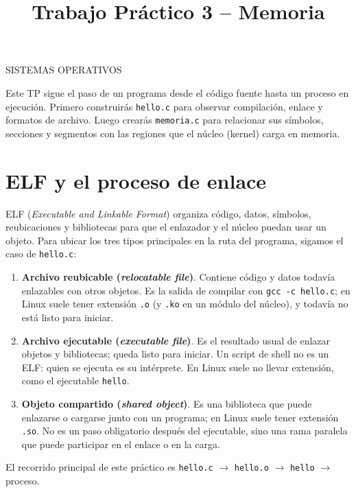 \documentclass[11pt,a4paper]{article}
\title{Trabajo Práctico 3 -- Memoria}
\author{}
\date{}
\begin{document}
\maketitle
\thispagestyle{fancy}
\begin{center}
SISTEMAS OPERATIVOS
\end{center}
\newpage

\tableofcontents
\newpage

Este TP sigue el paso de un programa desde el código fuente hasta un proceso
en ejecución. Primero construirás \texttt{hello.c} para observar compilación,
enlace y formatos de archivo. Luego crearás \texttt{memoria.c} para relacionar
sus símbolos, secciones y segmentos con las regiones que el núcleo (kernel)
carga en memoria.

\section{ELF y el proceso de enlace}

ELF (\emph{Executable and Linkable Format}) organiza código, datos, símbolos,
reubicaciones y bibliotecas para que el enlazador y el núcleo puedan usar un
objeto. Para ubicar los tres tipos principales en la ruta del programa,
sigamos el caso de \texttt{hello.c}:

\begin{enumerate}
  \item \textbf{Archivo reubicable (\emph{relocatable file})}. Contiene código
  y datos todavía enlazables con otros objetos. Es la salida de compilar con
  \texttt{gcc -c hello.c}; en Linux suele tener extensión \texttt{.o} (y
  \texttt{.ko} en un módulo del núcleo), y todavía no está listo para iniciar.
  \item \textbf{Archivo ejecutable (\emph{executable file})}. Es el resultado
  usual de enlazar objetos y bibliotecas; queda listo para iniciar. Un script
  de shell no es un ELF: quien se ejecuta es su intérprete. En Linux suele no
  llevar extensión, como el ejecutable \texttt{hello}.
  \item \textbf{Objeto compartido (\emph{shared object})}. Es una biblioteca
  que puede enlazarse o cargarse junto con un programa; en Linux suele tener
  extensión \texttt{.so}. No es un paso obligatorio después del ejecutable,
  sino una rama paralela que puede participar en el enlace o en la carga.
\end{enumerate}

El recorrido principal de este práctico es
\texttt{hello.c} $\longrightarrow$ \texttt{hello.o} $\longrightarrow$
\texttt{hello} $\longrightarrow$ proceso.
\end{document}

